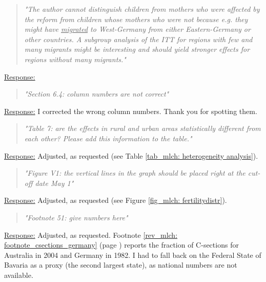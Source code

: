 




% 
\begin{quote}
	\textit{"The author cannot distinguish children from mothers who were affected by the reform from children whose mothers who were not because e.g. they might have \underline{migrated} to West-Germany from either Eastern-Germany or other countries. A subgroup analysis of the ITT for regions with few and many migrants might be interesting and should yield stronger effects for regions without many migrants."}
\end{quote}
\underline{Response:}

% 
\begin{quote}
	\textit{"Section 6.4: column numbers are not correct"}
\end{quote}
\underline{Response:} I corrected the wrong column numbers. Thank you for spotting them.

% 
\begin{quote}
	\textit{"Table 7: are the effects in rural and urban areas statistically different from each other? Please add this information to the table."}
\end{quote}
\underline{Response:} Adjusted, as requested (see Table \ref{tab_mlch: heterogeneity analysis}).

% 
\begin{quote}
	\textit{"Figure V1: the vertical lines in the graph should be placed right at the cut-off date May 1"}
\end{quote}
\underline{Response:} Adjusted, as requested (see Figure \ref{fig_mlch: fertilitydistr}).

% 
\begin{quote}
	\textit{"Footnote 51: give numbers here"}
\end{quote}
\underline{Response:} Adjusted, as requested. Footnote \ref{rev_mlch: footnote_csections_germany} (page \pageref{rev_mlch: footnote_csections_germany}) reports the fraction of C-sections for Australia in 2004 and Germany in 1982. I had to fall back on the Federal State of Bavaria as a proxy (the second largest state), as national numbers are not available.

